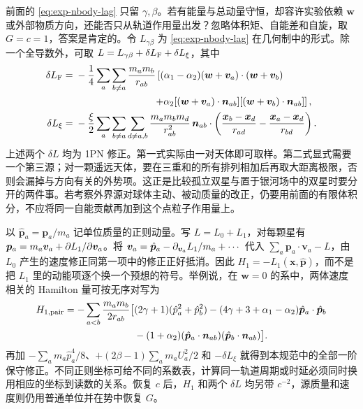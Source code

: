 前面的 \eqref{eq:exp-nbody-lag} 只留 $\gamma,\beta$。若有能量与总动量守恒，却容许实验依赖 $\bm w$ 或外部物质方向，还能否只从轨道作用量出发？忽略体积矩、自能差和自旋，取 $G=c=1$，答案是肯定的。令 $L_{\gamma\beta}$ 为 \eqref{eq:exp-nbody-lag} 在几何制中的形式。除一个全导数外，可取 $L=L_{\gamma\beta}+\delta L_{\rm F}+\delta L_\xi$，其中
\begin{align*}
 \delta L_{\rm F}={}&-\frac14\sum_a\sum_{b\ne a}\frac{m_am_b}{r_{ab}}
 \left[(\alpha_1-\alpha_2)(\bm w+\bm v_a)\cdot(\bm w+\bm v_b)\right.\\
 &\hspace{28mm}\left.+\alpha_2[(\bm w+\bm v_a)\cdot\bm n_{ab}]
                            [(\bm w+\bm v_b)\cdot\bm n_{ab}]\right],\\
 \delta L_\xi={}&-\frac{\xi}{2}\sum_a\sum_{b\ne a}
 \sum_{d\ne a,b}\frac{m_am_bm_d}{r_{ab}^2}\,
       \bm n_{ab}\cdot\left(\frac{\bm x_b-\bm x_d}{r_{ad}}
                       -\frac{\bm x_a-\bm x_d}{r_{bd}}\right).
\end{align*}
上述两个 $\delta L$ 均为 1PN 修正。第一式实际由一对天体即可取样。第二式显式需要一个第三源；对一颗遥远天体，要在三重和的所有排列相加后再取大距离极限，否则会漏掉与方向有关的外势项。这正是比较孤立双星与置于银河场中的双星时要分开的两件事。若考察外界源对球体主动、被动质量的改正，仍要用前面的有限体积分，不应将同一自能贡献再加到这个点粒子作用量上。

以 $\hat{\bm p}_a=\bm p_a/m_a$ 记单位质量的正则动量。写 $L=L_0+L_1$，对每颗星有 $\bm p_a=m_a\bm v_a+\partial L_1/\partial\bm v_a$。将 $\bm v_a=\hat{\bm p}_a-\partial_{\bm v_a}L_1/m_a+\cdots$ 代入 $\sum_a\bm p_a\cdot\bm v_a-L$，由 $L_0$ 产生的速度修正同第一项中的修正正好抵消。因此 $H_1=-L_1(\bm x,\hat{\bm p})$，而不是把 $L_1$ 里的动能项逐个换一个预想的符号。举例说，在 $\bm w=0$ 的系中，两体速度相关的 Hamilton 量可按无序对写为
\begin{align*}
 H_{1,{\rm pair}}=-\sum_{a<b}\frac{m_am_b}{2r_{ab}}\big[
 &(2\gamma+1)(\hat p_a^2+\hat p_b^2)
 -(4\gamma+3+\alpha_1-\alpha_2)\hat{\bm p}_a\cdot\hat{\bm p}_b\\
 &-(1+\alpha_2)(\hat{\bm p}_a\cdot\bm n_{ab})
                             (\hat{\bm p}_b\cdot\bm n_{ab})\big].
\end{align*}
再加 $-\sum_a m_a\hat p_a^4/8$、$+(2\beta-1)\sum_a m_aU_a^2/2$ 和 $-\delta L_\xi$ 就得到本规范中的全部一阶保守修正。不同正则坐标可给不同的系数表，计算同一轨道周期或时延必须同时换用相应的坐标到读数的关系。恢复 $c$ 后，$H_1$ 和两个 $\delta L$ 均另带 $c^{-2}$，源质量和速度则仍用普通单位并在势中恢复 $G$。


